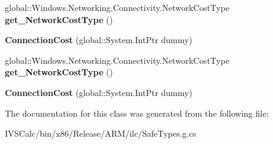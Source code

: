 \begin{DoxyCompactItemize}
global\+::\+Windows.\+Networking.\+Connectivity.\+Network\+Cost\+Type {\bfseries get\+\_\+\+Network\+Cost\+Type} ()
\item 
\mbox{\label{class_windows_1_1_networking_1_1_connectivity_1_1_connection_cost_a65894e1aefe1df308855493a30eca263}} 
{\bfseries Connection\+Cost} (global\+::\+System.\+Int\+Ptr dummy)
\item 
\mbox{\label{class_windows_1_1_networking_1_1_connectivity_1_1_connection_cost_a8fb29430f62e3c1dae2919f88e829fdc}} 
global\+::\+Windows.\+Networking.\+Connectivity.\+Network\+Cost\+Type {\bfseries get\+\_\+\+Network\+Cost\+Type} ()
\item 
\mbox{\label{class_windows_1_1_networking_1_1_connectivity_1_1_connection_cost_a65894e1aefe1df308855493a30eca263}} 
{\bfseries Connection\+Cost} (global\+::\+System.\+Int\+Ptr dummy)
\end{DoxyCompactItemize}


The documentation for this class was generated from the following file\+:\begin{DoxyCompactItemize}
\item 
I\+V\+S\+Calc/bin/x86/\+Release/\+A\+R\+M/ilc/Safe\+Types.\+g.\+cs\end{DoxyCompactItemize}
